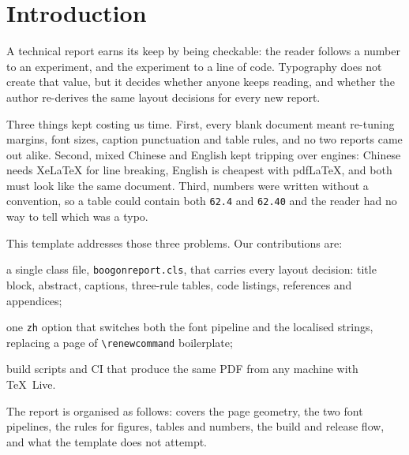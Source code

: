 \section{Introduction}
\label{sec:intro}

A technical report earns its keep by being checkable: the reader follows a number to an
experiment, and the experiment to a line of code. Typography does not create that value,
but it decides whether anyone keeps reading, and whether the author re-derives the same
layout decisions for every new report.

Three things kept costing us time. First, every blank document meant re-tuning margins,
font sizes, caption punctuation and table rules, and no two reports came out alike.
Second, mixed Chinese and English kept tripping over engines: Chinese needs XeLaTeX for
line breaking, English is cheapest with pdfLaTeX, and both must look like the same
document. Third, numbers were written without a convention, so a table could contain
both \texttt{62.4} and \texttt{62.40} and the reader had no way to tell which was a typo.

This template addresses those three problems. Our contributions are:

\begin{contributions}
  \item a single class file, \texttt{boogonreport.cls}, that carries every layout
        decision: title block, abstract, captions, three-rule tables, code listings,
        references and appendices;
  \item one \texttt{zh} option that switches both the font pipeline and the
        localised strings, replacing a page of \verb|\renewcommand| boilerplate;
  \item build scripts and CI that produce the same PDF from any machine with TeX~Live.
\end{contributions}

The report is organised as follows:  covers the page geometry,
 the two font pipelines,  the rules for figures,
tables and numbers,  the build and release flow, and
 what the template does not attempt.
